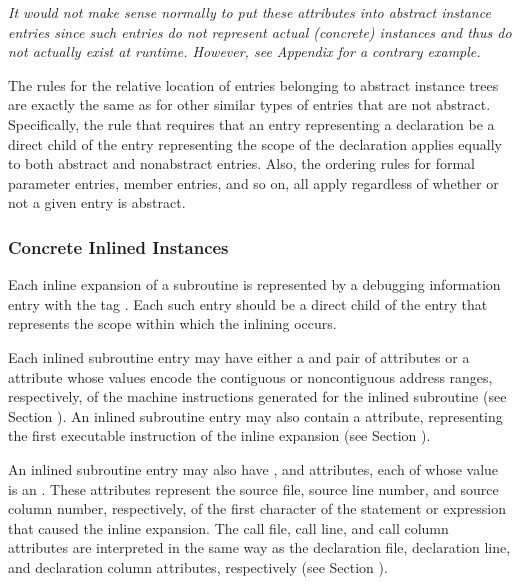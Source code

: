 \textit{It would not make sense normally to put these attributes into
abstract instance entries since such entries do not represent
actual (concrete) instances and thus do not actually exist at
run\dash time.  However, 
see Appendix  
for a contrary example.}

The rules for the relative location of entries belonging to
abstract instance trees are exactly the same as for other
similar types of entries that are not abstract. Specifically,
the rule that requires that an entry representing a declaration
be a direct child of the entry representing the scope of the
declaration applies equally to both abstract and non\dash abstract
entries. Also, the ordering rules for formal parameter entries,
member entries, and so on, all apply regardless of whether
or not a given entry is abstract.

\subsubsection{Concrete Inlined Instances}
\label{chap:concreteinlinedinstances}

Each inline expansion of a subroutine is represented
by a debugging information entry with the 
tag \DWTAGinlinedsubroutineTARG. 
Each such entry should be a direct
child of the entry that represents the scope within which
the inlining occurs.

Each inlined subroutine entry may have either a 
\DWATlowpc{}
and \DWAThighpc{} pair 
of 
attributes 
or 
a 
\DWATranges{}
attribute whose values encode the contiguous or non\dash contiguous
address ranges, respectively, of the machine instructions
generated for the inlined subroutine (see 
Section ). 
An
\hypertarget{chap:DWATentrypcentryaddressofinlinedsubprogram}{}
inlined subroutine entry may 
also 
contain 
a 
\DWATentrypc{}
attribute, representing the first executable instruction of
the inline expansion (see 
Section ).

An inlined 
\hypertarget{chap:DWATcalllinelinenumberofinlinedsubroutinecall}{}
subroutine 
\hypertarget{chap:DWATcallcolumncolumnpositionofinlinedsubroutinecall}{}
entry 
\hypertarget{chap:DWATcallfilefilecontaininginlinedsubroutinecall}{}
may also have \DWATcallfile,
\DWATcallline{} and \DWATcallcolumn{} attributes, 
each of whose
value is an . 
These attributes represent the
source file, source line number, and source column number,
respectively, of the first character of the statement or
expression that caused the inline expansion. The call file,
call line, and call column attributes are interpreted in
the same way as the declaration file, declaration line, and
declaration column attributes, respectively (see 
Section ).

